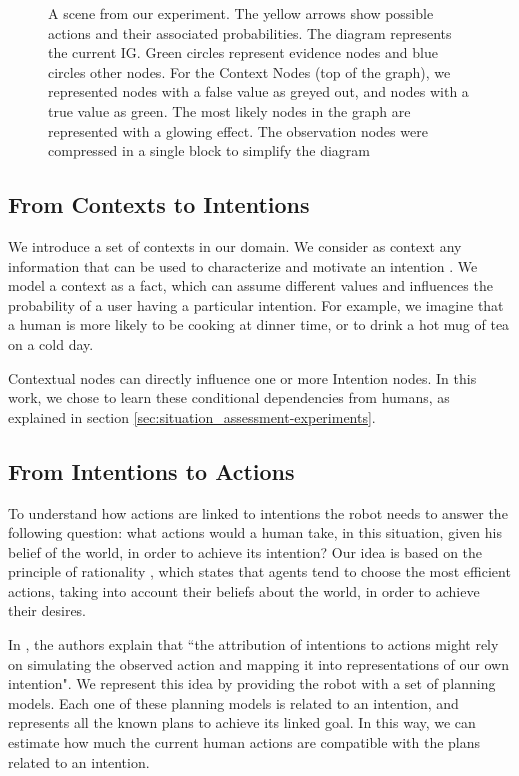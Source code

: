 \begin{figure}[ht!]
	\caption[Intention Graph]{A scene from our experiment. The yellow arrows show possible actions and their associated probabilities. The diagram represents the current IG. Green circles represent evidence nodes and blue circles other nodes. For the Context Nodes (top of the graph), we represented nodes with a false value as greyed out, and nodes with a true value as green. The most likely nodes in the graph are represented with a glowing effect. The observation nodes were compressed in a single block to simplify the diagram}
	\label{fig:situation_assessment-intention_graph}
\end{figure}

\subsection{From Contexts to Intentions}
We introduce a set of contexts in our domain. We consider as context any information that can be used to characterize and motivate an intention \cite{abowd1999towards}. We model a context  as a fact, which can assume different values and influences the probability of a user having a particular intention. For example, we imagine that a human is more likely to be cooking at dinner time, or to drink a hot mug of tea on a cold day.

Contextual nodes can directly influence one or more Intention nodes. In this work, we chose to learn these conditional dependencies from humans, as explained in section \ref{sec:situation_assessment-experiments}.

\subsection{From Intentions to Actions}
\label{sec:situation_assessment-action_evaluation}
To understand how actions are linked to intentions the robot needs to answer the following question: what actions would a human take, in this situation, given his belief of the world, in order to achieve its intention?
Our idea is based on the principle of rationality \cite{Dennet1989}, which states that agents tend to choose the most efficient actions, taking into account their beliefs about the world, in order to achieve their desires.

In \cite{Blakemore2001}, the authors explain that ``the attribution of intentions to actions might rely on simulating the observed action and mapping it into representations of our own intention". We represent this idea by providing the robot with a set of planning models. Each one of these planning models is related to an intention, and represents all the known plans to achieve its linked goal. In this way, we can estimate how much the current human actions are compatible with the plans related to an intention.

